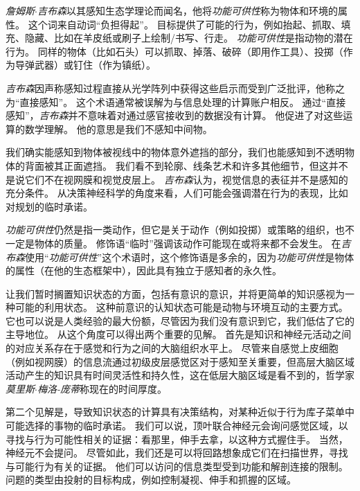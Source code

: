 \begin{proposition}[启示、感知和知识] \label{box:56_1}
	
	\quad \quad \textit{詹姆斯$\cdot$吉布森}以其感知生态学理论而闻名，他将\textit{功能可供性}称为物体和环境的属性。
	这个词来自动词“负担得起”。
	目标提供了可能的行为，例如抬起、抓取、填充、隐藏、比如在羊皮纸或刷子上绘制/书写、行走。
	\textit{功能可供性}是指动物的潜在行为。
	同样的物体（比如石头）可以抓取、掉落、破碎（即用作工具）、投掷（作为导弹武器）或钉住（作为镇纸）。
	
	\quad \quad \textit{吉布森}因声称感知过程直接从光学阵列中获得这些启示而受到广泛批评，他称之为“直接感知”。
	这个术语通常被误解为与信息处理的计算账户相反。
	通过“直接感知”，\textit{吉布森}并不意味着对通过感官接收到的数据没有计算。
	他促进了对这些运算的数学理解。
	他的意思是我们不感知中间物。
	
	\quad \quad 我们确实能感知到物体被视线中的物体意外遮挡的部分，我们也能感知到不透明物体的背面被其正面遮挡。
	我们看不到轮廓、线条艺术和许多其他细节，但这并不是说它们不在视网膜和视觉皮层上。
	\textit{吉布森}认为，视觉信息的表征并不是感知的充分条件。
	从决策神经科学的角度来看，人们可能会强调潜在行为的表现，比如对规划的临时承诺。
	
	\quad \quad \textit{功能可供性}仍然是指一类动作，但它是关于动作（例如投掷）或策略的组织，也不一定是物体的质量。
	修饰语“临时”强调该动作可能现在或将来都不会发生。
	在\textit{吉布森}使用“\textit{功能可供性}”这个术语时，这个修饰语是多余的，因为\textit{功能可供性}是物体的属性（在他的生态框架中），因此具有独立于感知者的永久性。
	
\end{proposition}


让我们暂时搁置知识状态的方面，包括有意识的意识，并将更简单的知识感视为一种可能的利用状态。
这种前意识的认知状态可能是动物与环境互动的主要方式。
它也可以说是人类经验的最大份额，尽管因为我们没有意识到它，我们低估了它的主导地位。
从这个角度可以得出两个重要的见解。
首先是知识和神经元活动之间的对应关系存在于感觉和行为之间的大脑组织水平上。
尽管来自感觉上皮细胞（例如视网膜）的信息流通过初级皮层感觉区对于感知至关重要，但高层大脑区域活动产生的知识具有时间灵活性和持久性，这在低层大脑区域是看不到的，哲学家\textit{莫里斯$\cdot$梅洛-庞蒂}称现在的时间厚度。


第二个见解是，导致知识状态的计算具有决策结构，对某种近似于行为库子菜单中可能选择的事物的临时承诺。
我们可以说，顶叶联合神经元会询问感觉区域，以寻找与行为可能性相关的证据：看那里，伸手去拿，以这种方式握住手。
当然，神经元不会提问。
尽管如此，我们还是可以将回路想象成它们在扫描世界，寻找与可能行为有关的证据。
他们可以访问的信息类型受到功能和解剖连接的限制。
问题的类型由投射的目标构成，例如控制凝视、伸手和抓握的区域。



